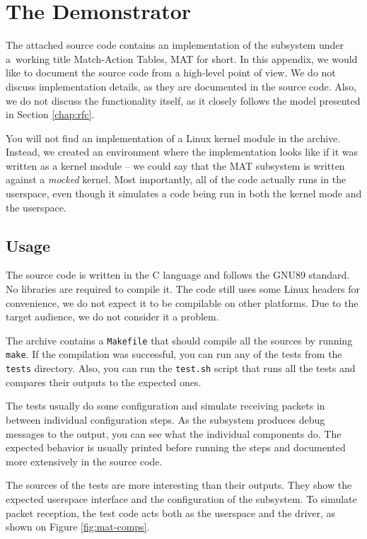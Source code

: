 \chapter{The Demonstrator}
\label{app:doc}

The attached source code contains an implementation of the subsystem under
a~working title Match-Action Tables, MAT for short. In this appendix, we would
like to document the source code from a high-level point of view. We do not
discuss implementation details, as they are documented in the source code.
Also, we do not discuss the functionality itself, as it closely follows the
model presented in Section \ref{chap:rfc}.

You will not find an implementation of a Linux kernel module in the archive.
Instead, we created an environment where the implementation looks like if it
was written as a kernel module -- we could say that the MAT subsystem is
written against a \emph{mocked} kernel. Most importantly, all of the code
actually runs in the userspace, even though it simulates a code being run in
both the kernel mode and the userspace.

\section{Usage}

The source code is written in the C language and follows the GNU89 standard.
No libraries are required to compile it. The code still uses some Linux
headers for convenience, we do not expect it to be compilable on other
platforms. Due to the target audience, we do not consider it a problem.

The archive contains a \texttt{Makefile} that should compile all the sources by
running \texttt{make}. If the compilation was successful, you can run any of
the tests from the \texttt{tests} directory. Also, you can run the
\texttt{test.sh} script that runs all the tests and compares their outputs to
the expected ones.

The tests usually do some configuration and simulate receiving packets in
between individual configuration steps. As the subsystem produces debug messages to the
output, you can see what the individual components do. The expected behavior is
usually printed before running the steps and documented more extensively in
the source code.

The sources of the tests are more interesting than their outputs. They show
the expected userspace interface and the configuration of the subsystem. To
simulate packet reception, the test code acts both as the userspace and the
 driver, as shown on Figure \ref{fig:mat-comps}.


